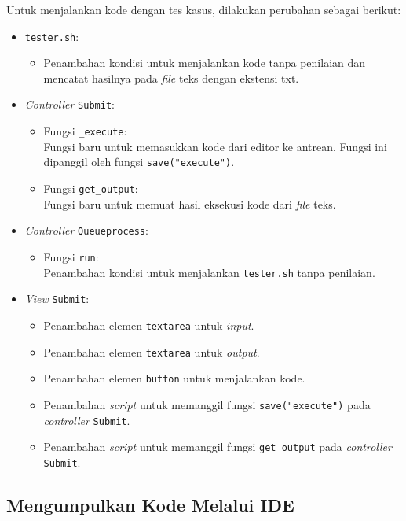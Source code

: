Untuk menjalankan kode dengan tes kasus, dilakukan perubahan sebagai berikut:
\begin{itemize}
	\item \verb|tester.sh|:
    \begin{itemize}
        \item Penambahan kondisi untuk menjalankan kode tanpa penilaian dan mencatat hasilnya pada \textit{file} teks dengan ekstensi txt.
    \end{itemize}
	\item \textit{Controller} \verb|Submit|:
    \begin{itemize}
        \item Fungsi \verb|_execute|: \\ Fungsi baru untuk memasukkan kode dari editor ke antrean. Fungsi ini dipanggil oleh fungsi \verb|save("execute")|.
        \item Fungsi \verb|get_output|: \\ Fungsi baru untuk memuat hasil eksekusi kode dari \textit{file} teks.
    \end{itemize}
	\item \textit{Controller} \verb|Queueprocess|:
    \begin{itemize}
        \item Fungsi \verb|run|: \\ Penambahan kondisi untuk menjalankan \verb|tester.sh| tanpa penilaian.
    \end{itemize}
    \item \textit{View} \verb|Submit|:
    \begin{itemize}
		\item Penambahan elemen \verb|textarea| untuk \textit{input}.
		\item Penambahan elemen \verb|textarea| untuk \textit{output}.
        \item Penambahan elemen \verb|button| untuk menjalankan kode.
        \item Penambahan \textit{script} untuk memanggil fungsi \verb|save("execute")| pada \textit{controller} \verb|Submit|.
        \item Penambahan \textit{script} untuk memanggil fungsi \verb|get_output| pada \textit{controller} \verb|Submit|.
    \end{itemize}
\end{itemize}

\subsection{Mengumpulkan Kode Melalui IDE}
\label{subsec:4:kumpul}

